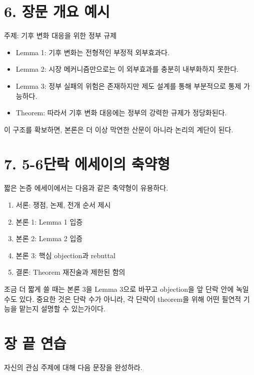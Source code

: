 \section{6. 장문 개요 예시}\label{6-uxc7a5uxbb38-uxac1cuxc694-uxc608uxc2dc}

주제: 기후 변화 대응을 위한 정부 규제

\begin{itemize}
\tightlist
\item
  Lemma 1: 기후 변화는 전형적인 부정적 외부효과다.
\item
  Lemma 2: 시장 메커니즘만으로는 이 외부효과를 충분히 내부화하지 못한다.
\item
  Lemma 3: 정부 실패의 위험은 존재하지만 제도 설계를 통해 부분적으로 통제 가능하다.
\item
  Theorem: 따라서 기후 변화 대응에는 정부의 강력한 규제가 정당화된다.
\end{itemize}

이 구조를 확보하면, 본론은 더 이상 막연한 산문이 아니라 논리의 계단이 된다.

\section{7. 5-6단락 에세이의 축약형}\label{7-5-6uxb2e8uxb77d-uxc5d0uxc138uxc774uxc758-uxcd95uxc57duxd615}

짧은 논증 에세이에서는 다음과 같은 축약형이 유용하다.

\begin{enumerate}
\def\labelenumi{\arabic{enumi}.}
\tightlist
\item
  서론: 쟁점, 논제, 전개 순서 제시
\item
  본론 1: Lemma 1 입증
\item
  본론 2: Lemma 2 입증
\item
  본론 3: 핵심 objection과 rebuttal
\item
  결론: Theorem 재진술과 제한된 함의
\end{enumerate}

조금 더 짧게 쓸 때는 본론 3을 Lemma 3으로 바꾸고 objection을 앞 단락 안에 녹일 수도 있다. 중요한 것은 단락 수가 아니라, 각 단락이 theorem을 위해 어떤 필연적 기능을 맡는지 설명할 수 있는가이다.

\section{장 끝 연습}\label{uxc7a5-uxb05d-uxc5f0uxc2b5-6}

자신의 관심 주제에 대해 다음 문장을 완성하라.

